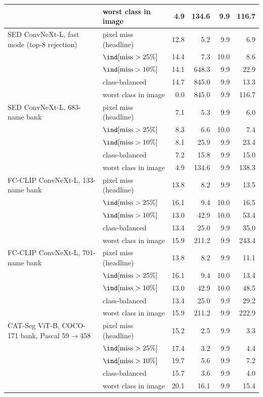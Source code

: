 \begin{tabular}{@{}llrrrr@{}}
 & worst class in image & 4.9 & 134.6 & 9.9 & 116.7 \\
\midrule
SED ConvNeXt-L, fast mode (top-8 rejection) & pixel miss (headline) & 12.8 & 5.2 & 9.9 & 6.9 \\
 & $\ind[\text{miss} > 25\%]$ & 14.4 & 7.3 & 10.0 & 8.6 \\
 & $\ind[\text{miss} > 10\%]$ & 14.1 & 648.3 & 9.9 & 22.9 \\
 & class-balanced & 14.7 & 845.0 & 9.9 & 13.3 \\
 & worst class in image & 0.0 & 845.0 & 9.9 & 116.7 \\
\midrule
SED ConvNeXt-L, 683-name bank & pixel miss (headline) & 7.1 & 5.3 & 9.9 & 6.0 \\
 & $\ind[\text{miss} > 25\%]$ & 8.3 & 6.6 & 10.0 & 7.4 \\
 & $\ind[\text{miss} > 10\%]$ & 8.1 & 25.9 & 9.9 & 23.4 \\
 & class-balanced & 7.2 & 15.8 & 9.9 & 15.0 \\
 & worst class in image & 4.9 & 134.6 & 9.9 & 138.3 \\
\midrule
FC-CLIP ConvNeXt-L, 133-name bank & pixel miss (headline) & 13.8 & 8.2 & 9.9 & 13.5 \\
 & $\ind[\text{miss} > 25\%]$ & 16.1 & 9.4 & 10.0 & 16.5 \\
 & $\ind[\text{miss} > 10\%]$ & 13.0 & 42.9 & 10.0 & 53.4 \\
 & class-balanced & 13.4 & 25.0 & 9.9 & 35.0 \\
 & worst class in image & 15.9 & 211.2 & 9.9 & 243.4 \\
\midrule
FC-CLIP ConvNeXt-L, 701-name bank & pixel miss (headline) & 13.8 & 8.2 & 9.9 & 11.1 \\
 & $\ind[\text{miss} > 25\%]$ & 16.1 & 9.4 & 10.0 & 13.4 \\
 & $\ind[\text{miss} > 10\%]$ & 13.0 & 42.9 & 10.0 & 48.5 \\
 & class-balanced & 13.4 & 25.0 & 9.9 & 29.2 \\
 & worst class in image & 15.9 & 211.2 & 9.9 & 222.9 \\
\midrule
CAT-Seg ViT-B, COCO-171 bank, Pascal 59$\to$458 & pixel miss (headline) & 15.2 & 2.5 & 9.9 & 3.3 \\
 & $\ind[\text{miss} > 25\%]$ & 17.4 & 3.2 & 9.9 & 4.4 \\
 & $\ind[\text{miss} > 10\%]$ & 19.7 & 5.6 & 9.9 & 7.2 \\
 & class-balanced & 15.7 & 3.6 & 9.9 & 4.0 \\
 & worst class in image & 20.1 & 16.1 & 9.9 & 15.4 \\
\bottomrule
\end{tabular}
